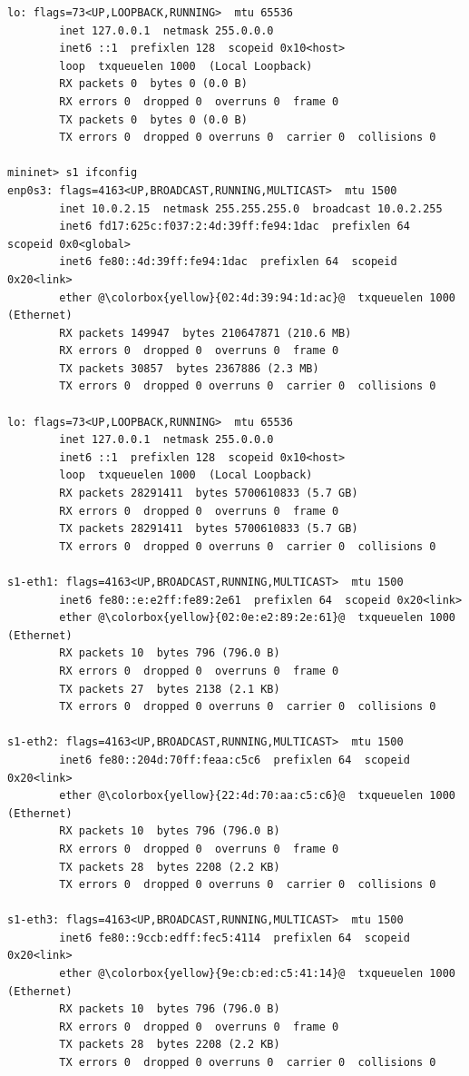 \documentclass{article}
\begin{document}
\begin{verbatim}
lo: flags=73<UP,LOOPBACK,RUNNING>  mtu 65536
        inet 127.0.0.1  netmask 255.0.0.0
        inet6 ::1  prefixlen 128  scopeid 0x10<host>
        loop  txqueuelen 1000  (Local Loopback)
        RX packets 0  bytes 0 (0.0 B)
        RX errors 0  dropped 0  overruns 0  frame 0
        TX packets 0  bytes 0 (0.0 B)
        TX errors 0  dropped 0 overruns 0  carrier 0  collisions 0

mininet> s1 ifconfig
enp0s3: flags=4163<UP,BROADCAST,RUNNING,MULTICAST>  mtu 1500
        inet 10.0.2.15  netmask 255.255.255.0  broadcast 10.0.2.255
        inet6 fd17:625c:f037:2:4d:39ff:fe94:1dac  prefixlen 64  scopeid 0x0<global>
        inet6 fe80::4d:39ff:fe94:1dac  prefixlen 64  scopeid 0x20<link>
        ether @\colorbox{yellow}{02:4d:39:94:1d:ac}@  txqueuelen 1000  (Ethernet)
        RX packets 149947  bytes 210647871 (210.6 MB)
        RX errors 0  dropped 0  overruns 0  frame 0
        TX packets 30857  bytes 2367886 (2.3 MB)
        TX errors 0  dropped 0 overruns 0  carrier 0  collisions 0

lo: flags=73<UP,LOOPBACK,RUNNING>  mtu 65536
        inet 127.0.0.1  netmask 255.0.0.0
        inet6 ::1  prefixlen 128  scopeid 0x10<host>
        loop  txqueuelen 1000  (Local Loopback)
        RX packets 28291411  bytes 5700610833 (5.7 GB)
        RX errors 0  dropped 0  overruns 0  frame 0
        TX packets 28291411  bytes 5700610833 (5.7 GB)
        TX errors 0  dropped 0 overruns 0  carrier 0  collisions 0

s1-eth1: flags=4163<UP,BROADCAST,RUNNING,MULTICAST>  mtu 1500
        inet6 fe80::e:e2ff:fe89:2e61  prefixlen 64  scopeid 0x20<link>
        ether @\colorbox{yellow}{02:0e:e2:89:2e:61}@  txqueuelen 1000  (Ethernet)
        RX packets 10  bytes 796 (796.0 B)
        RX errors 0  dropped 0  overruns 0  frame 0
        TX packets 27  bytes 2138 (2.1 KB)
        TX errors 0  dropped 0 overruns 0  carrier 0  collisions 0

s1-eth2: flags=4163<UP,BROADCAST,RUNNING,MULTICAST>  mtu 1500
        inet6 fe80::204d:70ff:feaa:c5c6  prefixlen 64  scopeid 0x20<link>
        ether @\colorbox{yellow}{22:4d:70:aa:c5:c6}@  txqueuelen 1000  (Ethernet)
        RX packets 10  bytes 796 (796.0 B)
        RX errors 0  dropped 0  overruns 0  frame 0
        TX packets 28  bytes 2208 (2.2 KB)
        TX errors 0  dropped 0 overruns 0  carrier 0  collisions 0

s1-eth3: flags=4163<UP,BROADCAST,RUNNING,MULTICAST>  mtu 1500
        inet6 fe80::9ccb:edff:fec5:4114  prefixlen 64  scopeid 0x20<link>
        ether @\colorbox{yellow}{9e:cb:ed:c5:41:14}@  txqueuelen 1000  (Ethernet)
        RX packets 10  bytes 796 (796.0 B)
        RX errors 0  dropped 0  overruns 0  frame 0
        TX packets 28  bytes 2208 (2.2 KB)
        TX errors 0  dropped 0 overruns 0  carrier 0  collisions 0
    \end{verbatim}
\end{document}
